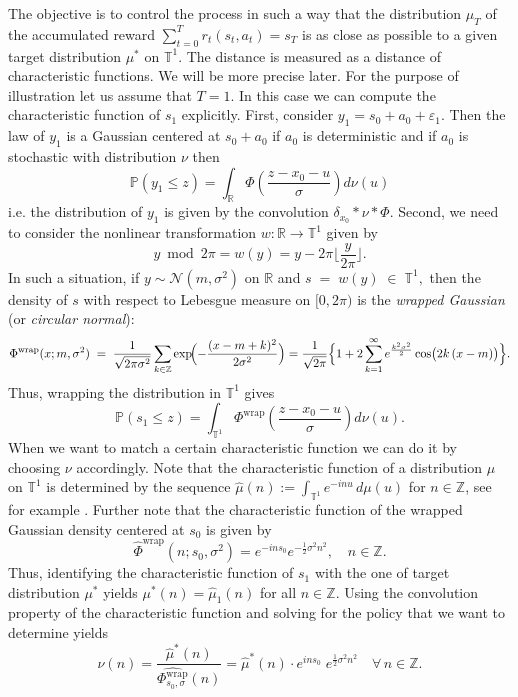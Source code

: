 \documentclass[reqno, 11pt]{amsart}%
\newcommand\PP{\mathbb P}
\newcommand\RR{\mathbb R}
\newcommand\TT{\mathbb T}
\newcommand\ZZ{\mathbb Z}
\theoremstyle{definition}
\begin{document}
The objective is to control the process in such a way that the distribution $\mu_T$ of the accumulated reward $ \sum_{t=0}^T r_t(s_t,a_t)=s_T$ is as close as possible to a given target distribution $\mu^*$ on $\mathbb{T}^1$. The distance is measured as a distance of characteristic functions. We will be more precise later.
For the purpose of illustration let us assume that $T=1$. In this case we can compute the characteristic function of $s_1$ explicitly. First, consider  $y_1=s_0+a_0+\varepsilon_1.$  Then the law of $y_1$ is a Gaussian centered at $s_0+a_0$ if $a_0$ is deterministic and if $a_0$ is stochastic with distribution $\nu$ then 
$$\PP(y_1\le z)= \int_\RR \Phi(\frac{z-x_0-u}{\sigma}) d \nu(u)  $$
i.e. the distribution of $y_1$ is given by the convolution 
$ \delta_{x_0}*\nu * \Phi.$
Second, we need to consider the nonlinear transformation $w:\RR \to \TT^1$  given by
 $$y\bmod{2\pi}=w(y)= y-2\pi \lfloor \frac{y}{2\pi}\rfloor. $$ 
In such a situation, if  \(y\sim\mathcal{N}(m,\sigma^{2})\) on \(\mathbb{R}\) and 
$s \;=\; w(y)  \;\in\; \mathbb{T}^{1},$ then the density of \(s\) with respect to Lebesgue measure on \([0,2\pi)\) is the
\emph{wrapped Gaussian} (or \emph{circular normal}): 
\[
\Phi^\text{wrap}(x;m,\sigma^{2})
 \;=\;
 \frac{1}{\sqrt{2\pi\sigma^{2}}}
 \sum_{k\in\mathbb{Z}}
     \exp\!\Bigl(-\frac{(x-m+k)^{2}}{2\sigma^{2}}\Bigr)=\frac{1}{\sqrt{2\pi}}\Bigl\{
 1+2\sum_{k=1}^{\infty}e^{\frac{k^2\sigma^{2}}{2}}\cos\bigl(2k\, (x-m)\bigr)\Bigr\} .
\]
Thus, wrapping the distribution in $\TT^1$ gives 
$$\PP(s_1\le z)= \int_{\TT^1} \Phi^\text{wrap}(\frac{z-x_0-u}{\sigma}) d \nu(u).  $$
When we want to match a certain characteristic function we can do it by choosing $\nu$ accordingly. Note that the characteristic function of a distribution $\mu$ on $\TT^1$ is determined by the sequence $\hat{\mu}(n) :=  \int_{\TT^1} e^{-i n u} \, d\mu(u)$ for $n \in \mathbb{Z}$,
see for example \cite[Chapter 1]{rudin1962fourier}.
Further note that the characteristic function of the wrapped Gaussian density centered at \( s_0 \)  is given by
\[
\widehat{\Phi}^{\text{wrap}}(n; s_0,\sigma^2) = e^{-i n s_0} e^{-\frac{1}{2} \sigma^2 n^2}, \quad n \in \mathbb{Z}.
\]
Thus, identifying the characteristic function of $s_1$ with the one of target distribution $\mu^*$ yields $\mu^*(n)=\widehat \mu_1(n)$ for all $ n\in \ZZ$.
Using the convolution property of the characteristic function and solving for the policy that we want to determine yields
$$\widehat \nu(n) = \frac{\widehat\mu^*(n)}{\widehat{\Phi^{\text{wrap}}_{s_0,\sigma}}(n)}=\widehat\mu^*(n) \cdot e^{i n s_0}\; e^{\frac{1}{2} \sigma^2 n^2} \quad \forall\, n\in \ZZ. $$
\end{document}
